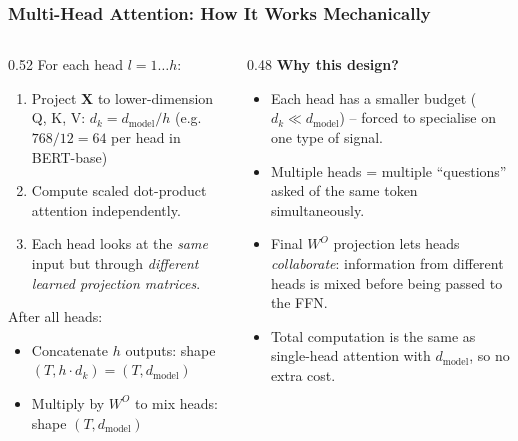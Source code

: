 \begin{frame}[fragile]\frametitle{Multi-Head Attention: How It Works Mechanically}
\begin{columns}
  \begin{column}[T]{0.52\linewidth}
    For each head $l = 1 \ldots h$:
    \begin{enumerate}
    \item Project $\mathbf{X}$ to lower-dimension Q, K, V:
          $d_k = d_{\text{model}} / h$
          (e.g.\ $768/12 = 64$ per head in BERT-base)
    \item Compute scaled dot-product attention independently.
    \item Each head looks at the \emph{same} input but through
          \emph{different learned projection matrices}.
    \end{enumerate}
    After all heads:
    \begin{itemize}
    \item Concatenate $h$ outputs: shape $(T, h \cdot d_k) = (T, d_{\text{model}})$
    \item Multiply by $W^O$ to mix heads: shape $(T, d_{\text{model}})$
    \end{itemize}
  \end{column}
  \begin{column}[T]{0.48\linewidth}
    \textbf{Why this design?}
    \begin{itemize}
    \item Each head has a smaller budget ($d_k \ll d_{\text{model}}$) – forced to
          specialise on one type of signal.
    \item Multiple heads = multiple ``questions'' asked of the same token simultaneously.
    \item Final $W^O$ projection lets heads \emph{collaborate}: information from
          different heads is mixed before being passed to the FFN.
    \item Total computation is the same as single-head attention with $d_{\text{model}}$,
          so no extra cost.
    \end{itemize}
  \end{column}
\end{columns}
\end{frame}

